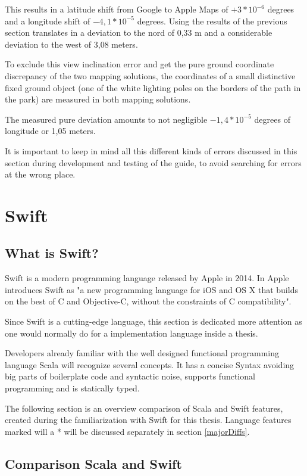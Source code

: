 This results in a latitude shift from Google to Apple Maps of \(+3 * 10^{-6}\) degrees and a longitude shift of \(-4,1 * 10^{-5}\) degrees. Using the results of the previous section translates in a deviation to the nord of 0,33 m and a considerable deviation to the west of 3,08 meters.

To exclude this view inclination error and get the pure ground coordinate discrepancy of the two mapping solutions, the coordinates of a small distinctive fixed ground object (one of the white lighting poles on the borders of the path in the park) are measured in both mapping solutions.

The measured pure deviation amounts to not negligible \(-1,4 * 10^{-5}\) degrees of longitude or 1,05 meters.

It is important to keep in mind all this different kinds of errors discussed in this section during development and testing of the guide, to avoid searching for errors at the wrong place.


\section{Swift}

\subsection{What is Swift?}

Swift is a modern programming language released by Apple in 2014. In \cite{swift-book} Apple introduces Swift as "a new programming language for iOS and OS X that builds on the best of C and Objective-C, without the constraints of C compatibility".

Since Swift is a cutting-edge language, this section is dedicated more attention as one would normally do for a implementation language inside a thesis. 

Developers already familiar with the well designed functional programming language Scala will recognize several concepts. It has a concise Syntax avoiding big parts of boilerplate code and syntactic noise, supports functional programming and is statically typed.

The following section is an overview comparison of Scala and Swift features, created during the familiarization with Swift for this thesis. Language features marked will a * will be discussed separately in section \ref{majorDiffs}.

\subsection{Comparison Scala and Swift}

